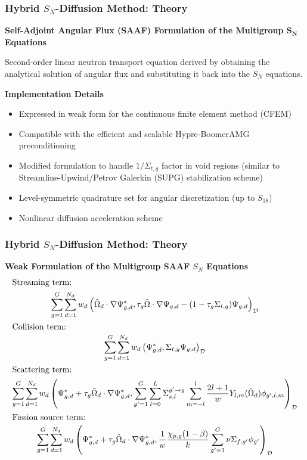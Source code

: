 \begin{frame}
  \frametitle{Hybrid $S_N$-Diffusion Method: Theory}
  \textbf{Self-Adjoint Angular Flux (SAAF) Formulation of the Multigroup $\bm{S_N}$ Equations}
  \vspace{.2cm}

  Second-order linear neutron transport equation derived by obtaining the analytical solution of
  angular flux and substituting it back into the $S_N$ equations.

  \begin{block}{\textbf{Implementation Details}}
    \begin{itemize}
      \item Expressed in weak form for the continuous finite element method (CFEM)
      \item Compatible with the efficient and scalable Hypre-BoomerAMG preconditioning
      \item Modified formulation to handle $1/\Sigma_{t,g}$ factor in void regions (similar to
        Streamline-Upwind/Petrov Galerkin (SUPG) stabilization scheme) \cite{wang_diffusion_2014}
      \item Level-symmetric quadrature set for angular discretization (up to $S_{18}$)
      \item Nonlinear diffusion acceleration scheme \cite{wang_diffusion_2014}
    \end{itemize}
  \end{block}
\end{frame}

\begin{frame}
  \frametitle{Hybrid $S_N$-Diffusion Method: Theory}
  \textbf{Weak Formulation of the Multigroup SAAF $S_N$ Equations}
  \begin{gather}
    \shortintertext{Streaming term:}
    \sum^G_{g=1}\sum^{N_d}_{d=1}w_d\left(\hat{\Omega}_d\cdot\nabla\Psi^*_{g,d},\tau_g\hat{\Omega}
    \cdot\nabla\Psi_{g,d}-(1-\tau_g\Sigma_{t,g})\Psi_{g,d}\right)_\mathcal{D} \\
    \shortintertext{Collision term: }
    \sum^G_{g=1}\sum^{N_d}_{d=1}w_d\left(\Psi^*_{g,d},\Sigma_{t,g}\Psi_{g,d}\right)_\mathcal{D} \\
    \shortintertext{Scattering term:}
    \sum^G_{g=1}\sum^{N_d}_{d=1}w_d\left(\Psi^*_{g,d}+\tau_g\hat{\Omega}_d\cdot\nabla\Psi^*_{g,d},
    \sum^G_{g'=1}\sum^L_{l=0}\Sigma^{g'\rightarrow g}_{s,l}\sum^l_{m=-l}
    \frac{2l+1}{w}Y_{l,m}(\hat{\Omega}_d)\phi_{g',l,m}\right)_\mathcal{D} \\
    \shortintertext{Fission source term: }
    \sum^G_{g=1}\sum^{N_d}_{d=1}w_d\left(\Psi^*_{g,d}+\tau_g\hat{\Omega}_d\cdot\nabla\Psi^*_{g,d},
    \frac{1}{w}\frac{\chi_{p,g}(1-\beta)}{k}\sum^G_{g'=1}\nu\Sigma_{f,g'}\phi_{g'}\right)_\mathcal{D}
  \end{gather}
\end{frame}

